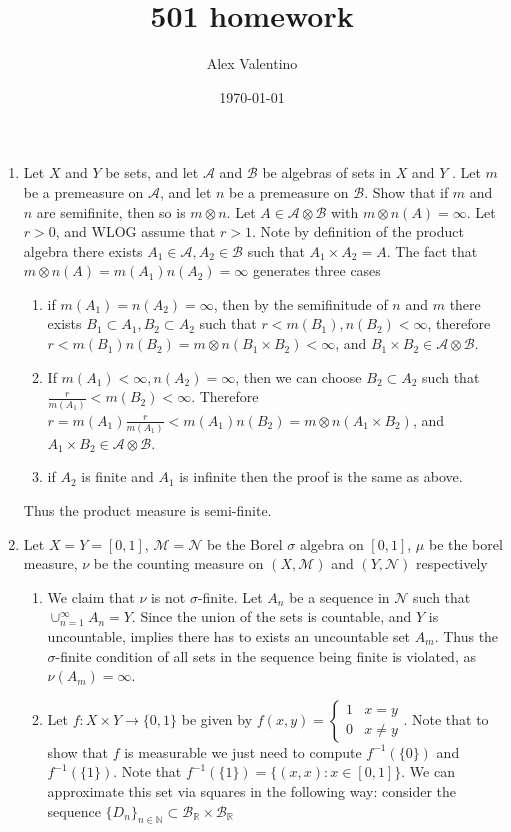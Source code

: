 \documentclass[12pt, letterpaper]{article}
\date{\today}
\author{Alex Valentino}
\title{501 homework}
\newcommand{\N}{\mathbb{N}}
\newcommand{\R}{\mathbb{R}}
\begin{document}
\begin{enumerate}
	\item Let $X$ and $Y$ be sets, and let $\mathcal{A}$ and $\mathcal{B}$ be algebras
	of sets in $X$ and $Y$ . Let $m$ be a premeasure on $\mathcal A$, and let $n$ be a
	premeasure on $\mathcal B$. Show that if $m$ and $n$ are semifinite, then so is 
	$m \otimes n$.  Let $A \in \mathcal{A} \otimes \mathcal{B}$ with 
	$m \otimes n (A) = \infty$.  Let $r > 0$, and WLOG assume  that $r > 1$.  Note by
	definition of the product algebra there exists 
	$A_1 \in \mathcal{A}, A_2 \in \mathcal{B}$ such that $A_1 \times A_2 = A$.
	The fact that $m \otimes n(A) = m(A_1)n(A_2) = \infty$ generates three cases
 	\begin{enumerate}
 		\item if $m(A_1) = n(A_2) = \infty$, then by the semifinitude of $n$ and $m$
 		there exists $B_1 \subset A_1, B_2 \subset A_2$ such that 
 		$r < m(B_1), n(B_2) < \infty$, therefore $r < m(B_1)n(B_2) = m \otimes n(B_1 \times B_2) < \infty$, and 
 		$B_1 \times B_2 \in \mathcal{A} \otimes \mathcal{B}$.
 		\item If $m(A_1) < \infty, n(A_2) = \infty$, then we can choose 
 		$B_2 \subset A_2$ such that $\frac{r}{m(A_1)} < m(B_2) < \infty$.
 		Therefore $r = m(A_1) \frac{r}{m(A_1)} < m(A_1) n(B_2)= m \otimes n(A_1 \times B_2) $, and $A_1 \times B_2 \in \mathcal{A}\otimes \mathcal{B}$.
 		\item if $A_2$ is finite and $A_1$ is infinite then the proof is the same as above.
 		
	\end{enumerate}
	Thus the product measure is semi-finite.
	\item Let $X = Y = [0,1]$, $\mathcal{M} = \mathcal{N}$ be the Borel $\sigma$ 
	algebra on $[0,1]$, $\mu$ be the borel measure, $\nu$ be the counting measure on 
	$(X,\mathcal{M})$ and $(Y,\mathcal{N})$ respectively
	\begin{enumerate}
		\item We claim that $\nu$ is not $\sigma$-finite.  Let $A_n$ be a sequence in 
		$\mathcal{N}$ such that $\cup_{n=1}^\infty A_n = Y$.  Since the union of the 
		sets is countable, and $Y$ is uncountable, implies there has to exists an 
		uncountable set $A_m$.  Thus the $\sigma$-finite condition of 
		all sets in the sequence being finite is violated, as $\nu(A_m) = \infty$.
		\item Let $f: X \times Y \to \{0,1\}$ be given by 
		$f(x,y) = \begin{cases}1 & x  = y\\ 0 & x \neq y \end{cases}$.  Note that 
		to show that $f$ is measurable we just need to compute 
		$f^{-1}(\{0\})$ and $f^{-1}(\{1\})$. Note that
		$f^{-1}(\{1\}) = \{(x,x): x \in [0,1]\}$.  We can approximate this set via 
		squares in the following way: consider the sequence 
		$\{D_n\}_{n \in \N} \subset \mathcal{B}_{\R} \times \mathcal{B}_{\R}$ 
		

\end{enumerate}
\end{enumerate}
\end{document}
